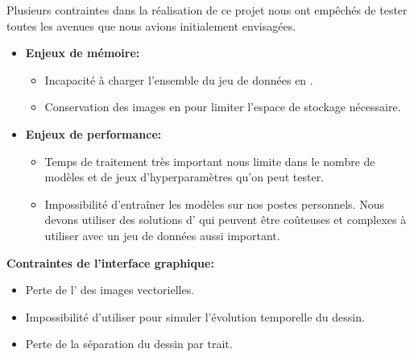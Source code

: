 Plusieurs contraintes dans la réalisation de ce projet nous ont empêchés de tester toutes les avenues que nous avions initialement envisagées.
\begin{itemize}
  \item \textbf{Enjeux de mémoire:}
	  \begin{itemize}
	      \item Incapacité à charger l'ensemble du jeu de données en .
	      \item Conservation des images en  pour limiter l'espace de stockage nécessaire.
	  \end{itemize}
  \item \textbf{Enjeux de performance:}
	  \begin{itemize}
		\item Temps de traitement très important nous limite dans le nombre de modèles et de jeux d'hyperparamètres qu'on peut tester.
		\item Impossibilité d'entraîner les modèles sur nos postes personnels. Nous devons utiliser des solutions d' qui peuvent être coûteuses et complexes à utiliser avec un jeu de données aussi important.
	\end{itemize}
\end{itemize}

\textbf{Contraintes de l'interface graphique:}
\begin{itemize}
    \item Perte de l' des images vectorielles.
    \item Impossibilité d'utiliser  pour simuler l'évolution temporelle du dessin.
	\item Perte de la séparation du dessin par trait.
\end{itemize}

\vspace{-.25mm}